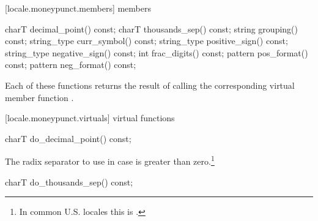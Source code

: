 [locale.moneypunct.members]{ members}

%
%
%
%
%
%
%
%
%
%
%
%
%
%
%
%
%
%
\begin{codeblock}
charT        decimal_point() const;
charT        thousands_sep() const;
string       grouping()      const;
string_type  curr_symbol()   const;
string_type  positive_sign() const;
string_type  negative_sign() const;
int          frac_digits()   const;
pattern      pos_format()    const;
pattern      neg_format()    const;
\end{codeblock}

\pnum
Each of these functions 
returns the result of calling the corresponding
virtual member function
.

[locale.moneypunct.virtuals]{ virtual functions}

%
%
\begin{itemdecl}
charT do_decimal_point() const;
\end{itemdecl}

\begin{itemdescr}
\pnum
\returns
The radix separator to use in case
is greater than zero.\footnote{In common U.S. locales this is
.}
\end{itemdescr}

%
%
\begin{itemdecl}
charT do_thousands_sep() const;
\end{itemdecl}

